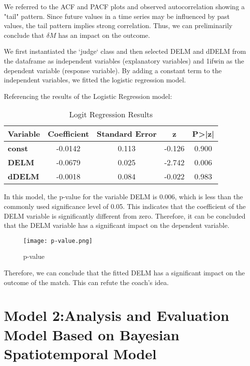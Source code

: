 \documentclass[12pt]{article}
\begin{document}
We referred to the ACF and PACF plots and observed autocorrelation showing a "tail" pattern. Since future values in a time series may be influenced by past values, the tail pattern implies strong correlation. Thus, we can preliminarily conclude that $\delta M$ has an impact on the outcome.

We first instantiated the `judge` class and then selected DELM and dDELM from the dataframe as independent variables (explanatory variables) and 1ifwin as the dependent variable (response variable). By adding a constant term to the independent variables, we fitted the logistic regression model.

Referencing the results of the Logistic Regression model:

\begin{table}[H]
	\centering
	\caption{Logit Regression Results}
	\begin{tabular}{lcccc}
		\toprule
		\textbf{Variable} & \textbf{Coefficient} & \textbf{Standard Error} & \textbf{z} & \textbf{P>|z|} \\
		\midrule
		\textbf{const} & -0.0142 & 0.113 & -0.126 & 0.900 \\
		\textbf{DELM} & -0.0679 & 0.025 & -2.742 & 0.006 \\
		\textbf{dDELM} & -0.0018 & 0.084 & -0.022 & 0.983 \\
		\bottomrule
	\end{tabular}\label{tb:logit}
\end{table}

In this model, the p-value for the variable DELM is 0.006, which is less than the commonly used significance level of 0.05. This indicates that the coefficient of the DELM variable is significantly different from zero. Therefore, it can be concluded that the DELM variable has a significant impact on the dependent variable.

\begin{figure}[H]
	\centering
	\texttt{[image: p-value.png]}
	\caption{p-value}\label{fig:pvalue}
\end{figure}

Therefore, we can conclude that the fitted DELM has a significant impact on the outcome of the match. This can refute the coach's idea.

\section{Model 2:Analysis and Evaluation Model Based on Bayesian Spatiotemporal Model}
\end{document}
